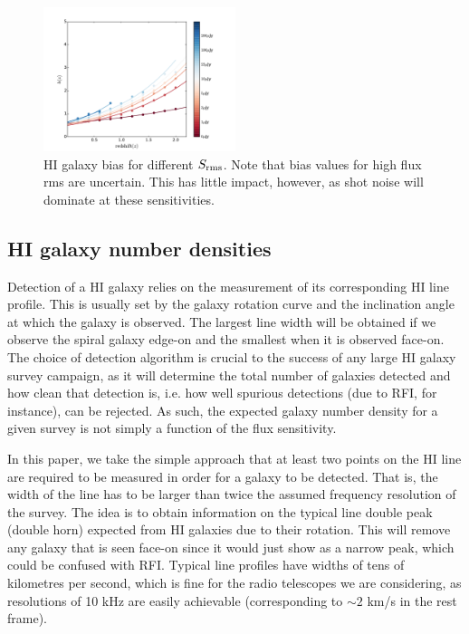 \documentclass[useAMS,usenatbib]{mn2e}
\begin{document}
\begin{figure}
\includegraphics[width=0.5\textwidth]{plots/fitted_bias.pdf}
\caption{HI galaxy bias for different $S_{\rm{rms}}$. Note that bias values for high flux rms are uncertain.
This has little impact, however, as shot noise will dominate at these sensitivities.} 
\label{fig:bias_fit_sax3}
\end{figure}

\subsection{HI galaxy number densities}

Detection of a HI galaxy relies on the measurement of its corresponding HI line profile. This is usually set by the galaxy rotation curve and the inclination angle at which the galaxy is observed. The largest line width will be obtained if we observe the spiral galaxy edge-on and the smallest when it is observed face-on. The choice of detection algorithm is crucial to the success of any large HI galaxy survey campaign, as it will determine the total number of galaxies detected and how clean that detection is, i.e. how well spurious detections (due to RFI, for instance), can be rejected. As such, the expected galaxy number density for a given survey is not simply a function of the flux sensitivity. 


In this paper, we take the simple approach that at least two points on the HI line are required to be
measured in order for a galaxy to be detected. That is, the width of the line has to be larger than twice the assumed frequency resolution of the survey. The idea is to obtain information on the
typical line double peak (double horn) expected from HI galaxies due to their rotation. This will remove any galaxy that is seen face-on since it would just show as a
narrow peak, which could be confused with RFI. Typical line profiles have widths of tens of kilometres per second, which is fine for the radio telescopes we are considering, as resolutions of 10 kHz are easily achievable (corresponding to $\sim2$ km/s in the rest frame). 
\end{document}
